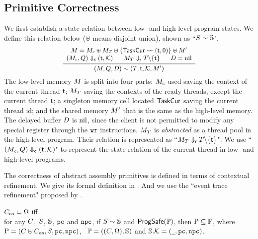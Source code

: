 % 
\subsection{Primitive Correctness}
\label{subsec:correctness-primitive}

We first establish a state relation
between low- and high-level program states.
We define this relation below 
($\uplus$ means disjoint union), shown as
``${S} \sim {\mathbb{S}}$".
\[
    \small
    \infer
    {
        \stateRel{(\Mem, \Rstate, \DBuf)}
            {(\thrdpool, \thrdid, \hthrdlocalst, \Mem')}
    }
    {
        \begin{array}{c}
            \Mem = \Mem_c \uplus \Mem_T \uplus
                \{ \TaskCur \rightsquigarrow (\thrdid, 0) \}
                \uplus \Mem' \\
            \curStRel{(\Mem_c, \Rstate)}{(\thrdid, \hthrdlocalst)}
            \quad \ \
            \rdyStRel{\Mem_T}{\thrdpool \backslash \{ \thrdid \}}
            \quad \ \
            \DBuf = \nil
        \end{array}
    }
\]
The low-level memory $M$ is split into four parts:
$M_c$ used saving the context of the current thread $\textsf{t}$;
$M_T$ saving the contexts of the ready threads,
except the current thread $\textsf{t}$; a singleton memory
cell located $\mathsf{TaskCur}$ saving the current thread id; 
and the shared memory $M'$ 
that is the same as the high-level memory.
The delayed buffer $D$ is $\text{nil}$, since the client
is not permitted to modify any special register
through the $\texttt{wr}{}$ instructions. $M_T$ 
is {\it abstracted} as a thread pool
in the high-level program. Their relation is represented as
``${M_T} \Downarrow_{\textsf{r}} {T \backslash \{ \textsf{t} \}}$".
We use ``${(M_c, Q)} \Downarrow_{\textsf{c}} {(\textsf{t}, \mathcal{K})}$"
to represent the state relation of the current thread
in low- and high-level programs.

The correctness of abstract assembly primitives
is defined in terms of contextual refinement.
We give its formal definition in
\Def{\ref{def:prim-correctness}}.
And we use the ``event trace refinement"
proposed by \etal{Liang} \cite{liang14lics}.

\begin{definition}
    \label{def:prim-correctness}
    {\em $C_{\text{as}} \sqsubseteq \Omega$} iff  \\
    for any {\em $C$}, {\em $S$}, {\em $\mathbb{S}$}, 
    {\em $\texttt{pc}$} and {\em $\texttt{npc}$}, if
    {\em ${S} \sim {\mathbb{S}}$} and {\em $\textsf{ProgSafe}(\mathbb{P})$},
    then {\em $\text{P} \subseteq \mathbb{P}$}, 
    where {\em $\text{P} = (C \uplus C_{\text{as}}, S, \texttt{pc}, \texttt{npc})$}, \,
        {\em $\mathbb{P} = ((C, \Omega), \mathbb{S})$} and
        {\em $\mathbb{S}.\mathcal{K} = (\underline{\ \,}, \texttt{pc}, \texttt{npc})$}.
\end{definition}


